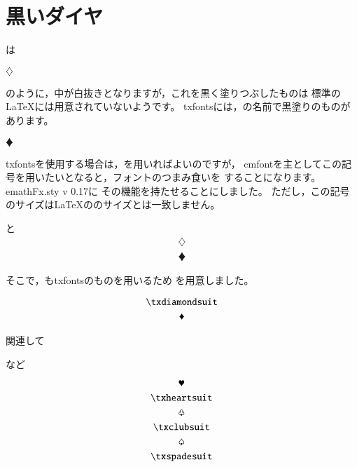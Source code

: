 \documentclass[a4j,fleqn]{jarticle}
\begin{document}
\section{黒いダイヤ}
は

\begin{showEx}{}
$\diamondsuit$
\end{showEx}
のように，中が白抜きとなりますが，これを黒く塗りつぶしたものは
標準の\LaTeX には用意されていないようです。
\textsf{txfonts}には，の名前で黒塗りのものがあります。

\begin{showEx}{}
$\vardiamondsuit$
\end{showEx}

\textsf{txfonts}を使用する場合は，を用いればよいのですが，
\textsf{cmfont}を主としてこの記号を用いたいとなると，フォントのつまみ食いを
することになります。\textsf{emathFx.sty v 0.17}に
その機能を持たせることにしました。
ただし，この記号のサイズは\LaTeX ののサイズとは一致しません。

\begin{showEx}{と}
\begin{gather*}
\diamondsuit\\
\vardiamondsuit
\end{gather*}
\end{showEx}

そこで，も\textsf{txfonts}のものを用いるため
を用意しました。

\begin{showEx}{}
\begin{gather*}
\txdiamondsuit\\
\vardiamondsuit
\end{gather*}
\end{showEx}

関連して

\begin{showEx}{など}
\begin{gather*}
\varheartsuit \\
\txheartsuit \\
\varclubsuit \\
\txclubsuit \\
\varspadesuit \\
\txspadesuit 
\end{gather*}
\end{showEx}
\end{document}
